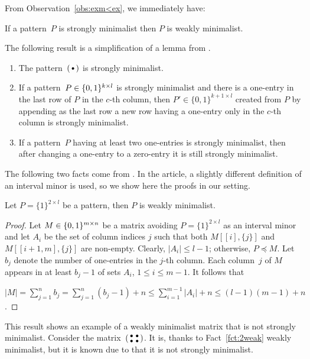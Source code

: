 From Observation~\ref{obs:exm<ex}, we immediately have:

\begin{obs}
\label{obs:strongweak}
If a pattern~$P$ is strongly minimalist then $P$ is weakly minimalist.
\end{obs}

The following result is a simplification of a lemma from \cite{cibulka}.

\begin{fct}
\label{fct:minimalist}
\begin{enumerate}
	\item The pattern~$\left(\begin{smallmatrix}\bullet\end{smallmatrix}\right)$ is strongly minimalist.
	\item If a pattern~$P\in\{0,1\}^{k\times l}$ is strongly minimalist and there is a one-entry in the last row of $P$ in the $c$-th column, then $P'\in\{0,1\}^{k+1\times l}$ created from $P$ by appending as the last row a new row having a one-entry only in the $c$-th column is strongly minimalist.
	\item If a pattern~$P$ having at least two one-entries is strongly minimalist, then after changing a one-entry to a zero-entry it is still strongly minimalist.
\end{enumerate}
\end{fct}

The following two facts come from \cite{bigraphs}. In the article, a slightly different definition of an interval minor is used, so we show here the proofs in our setting.

\begin{fct}
\label{fct:2weak}
Let $P=\{1\}^{2\times l}$ be a pattern, then $P$ is weakly minimalist.
\end{fct}
\begin{proof}
Let $M\in\{0,1\}^{m\times n}$ be a matrix avoiding $P=\{1\}^{2\times l}$ as an interval minor and let $A_i$ be the set of column indices $j$ such that both $M[[i],\{j\}]$ and $M[[i+1,m],\{j\}]$ are non-empty. Clearly, $|A_i|\leq l-1$; otherwise, $P\preceq M$. Let $b_j$ denote the number of one-entries in the $j$-th column. Each column~$j$ of $M$ appears in at least $b_j-1$ of sets $A_i$, $1\leq i\leq m-1$. It follows that

$|M|=\sum\limits_{j=1}^nb_j=\sum\limits_{j=1}^n(b_j-1)+n\leq\sum\limits_{i=1}^{m-1}|A_i|+n\leq(l-1)(m-1)+n$.
\end{proof}

This result shows an example of a weakly minimalist matrix that is not strongly minimalist. Consider the matrix~$\left(\begin{smallmatrix}\bullet&\bullet\\\bullet&\bullet\end{smallmatrix}\right)$. It is, thanks to Fact~\ref{fct:2weak} weakly minimalist, but it is known due to \cite{p33} that it is not strongly minimalist.

